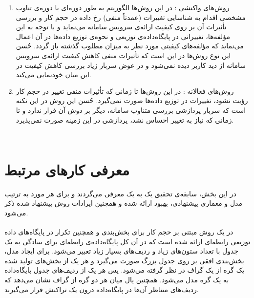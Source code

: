 \begin{enumerate}
	\item
روش‌های واکنشی
:
در این روش‌ها الگوریتم به طور دوره‌ای با دوره‌ی تناوب مشخصی اقدام به شناسایی تغییرات (عمدتاً منفی) رخ داده در حجم کار و بررسی تأثیرات آن بر روی کیفیت ارائه‌ی سرویس سامانه می‌نماید و با توجه به این مؤلفه‌ها، تغییراتی در پایگاه‌داده‌ی توزیعی و نحوه‌ی توزیع داده‌ها در آن اعمال می‌نماید که مؤلفه‌های کیفیتی مورد نظر به میزان مطلوب گذشته باز گردد. حُسن این نوع روش‌ها در این است که تأثیرات منفی کاهش کیفیت ارائه‌ی سرویس سامانه از دید کاربر دیده نمی‌شود و در عوض سربار زیاد بررسی کاهش کیفیت در این میان خودنمایی می‌کند.

	\item
روش‌های فعالانه
:
در این روش‌ها تا زمانی که تأثیرات منفی تغییر در حجم کار رؤیت نشود، تغییرات در توزیع داده‌ها صورت نمی‌گیرد. حُسن این روش در این نکته است که سربار پردازشی بررسی متناوب سامانه، دیگر بر دوش آن قرار ندارد و تا زمانی که نیاز به تغییر احساس نشد، پردازشی در این زمینه صورت نمی‌پذیرد.

\end{enumerate}


‌\section{معرفی کارهای مرتبط}

\paragraph*{}
در این بخش، سابقه‌ی تحقیق یک به یک معرفی می‌گردند و برای هر مورد به ترتیب مدل و معماری پیشنهادی، بهبود ارائه شده و همچنین ایرادات روش پیشنهاد شده ذکر می‌شود.

\paragraph*{}
در
\cite{curino-2011}
یک روش مبتنی بر حجم کار برای بخش‌بندی و همچنین تکرار در پایگاه‌های داده توزیعی رابطه‌ای ارائه شده است که در آن کل پایگاه‌داده‌ی رابطه‌ای برای سادگی به یک جدول با تعداد ستون‌های زیاد و ردیف‌های بسیار زیاد تعبیر می‌شود. برای ایجاد مدل، بخش‌بندی افقی بر روی جدول بزرگ صورت می‌گیرد و هر یک از بخش‌های تولید شده یک گره از یک گراف در نظر گرفته می‌شود. پس هر یک از ردیف‌های جدول پایگاه‌داده به یک گره مدل می‌شود. همچنین یال میان هر دو گره از گراف نشان می‌دهد که ردیف‌های متناظر آن‌ها در پایگاه‌داده درون یک تراکنش قرار می‌گیرند.
\cite{schism-2010}

